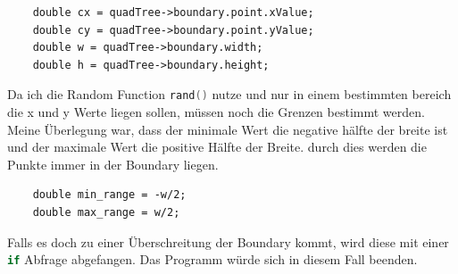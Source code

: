 \documentclass[11pt]{article}
\newcommand{\lstin}[1]{\lstinline[language=C]{#1}}
\begin{document}
\begin{lstlisting}
    double cx = quadTree->boundary.point.xValue; 
    double cy = quadTree->boundary.point.yValue; 
    double w = quadTree->boundary.width; 
    double h = quadTree->boundary.height;
\end{lstlisting}
Da ich die Random Function \lstin{rand()} nutze und nur in einem bestimmten bereich die x und y Werte liegen sollen, müssen noch die Grenzen bestimmt werden. Meine Überlegung war, dass der minimale Wert die negative hälfte der breite ist und der maximale Wert  die positive Hälfte der Breite.
durch dies werden die Punkte immer in der Boundary liegen. 
\begin{lstlisting}
    double min_range = -w/2; 
    double max_range = w/2; 
\end{lstlisting}
Falls es doch zu einer Überschreitung der Boundary kommt, wird diese mit einer \lstin{if} Abfrage abgefangen. Das Programm würde sich in diesem Fall beenden. 
\end{document}
